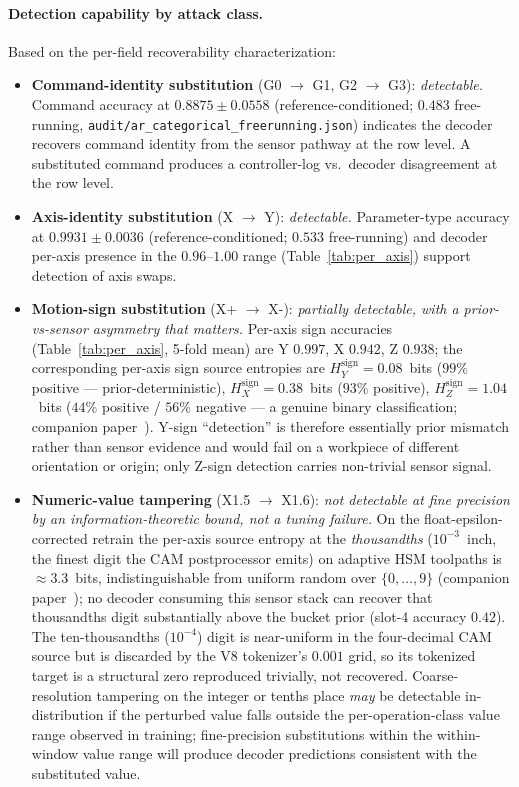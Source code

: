 \documentclass[11pt,a4paper]{article}
\begin{document}
\paragraph{Detection capability by attack class.} Based on the per-field recoverability characterization:
\begin{itemize}
\item \textbf{Command-identity substitution} (G0 $\to$ G1, G2 $\to$ G3): \emph{detectable.} Command accuracy at $0.8875 \pm 0.0558$ (reference-conditioned; $0.483$ free-running, \texttt{audit/ar\_categorical\_freerunning.json}) indicates the decoder recovers command identity from the sensor pathway at the row level. A substituted command produces a controller-log vs.\ decoder disagreement at the row level.
\item \textbf{Axis-identity substitution} (X $\to$ Y): \emph{detectable.} Parameter-type accuracy at $0.9931 \pm 0.0036$ (reference-conditioned; $0.533$ free-running) and decoder per-axis presence in the $0.96$--$1.00$ range (Table~\ref{tab:per_axis}) support detection of axis swaps.
\item \textbf{Motion-sign substitution} (X+ $\to$ X-): \emph{partially detectable, with a prior-vs-sensor asymmetry that matters.} Per-axis sign accuracies (Table~\ref{tab:per_axis}, 5-fold mean) are Y $0.997$, X $0.942$, Z $0.938$; the corresponding per-axis sign source entropies are $H_{Y}^{\text{sign}} = 0.08$~bits ($99\%$ positive --- prior-deterministic), $H_{X}^{\text{sign}} = 0.38$~bits ($93\%$ positive), $H_{Z}^{\text{sign}} = 1.04$~bits ($44\%$ positive / $56\%$ negative --- a genuine binary classification; companion paper~\cite{paperB_entropy}). Y-sign ``detection'' is therefore essentially prior mismatch rather than sensor evidence and would fail on a workpiece of different orientation or origin; only Z-sign detection carries non-trivial sensor signal.
\item \textbf{Numeric-value tampering} (X1.5 $\to$ X1.6): \emph{not detectable at fine precision by an information-theoretic bound, not a tuning failure.} On the float-epsilon-corrected retrain the per-axis source entropy at the \emph{thousandths} ($10^{-3}$~inch, the finest digit the CAM postprocessor emits) on adaptive HSM toolpaths is $\approx 3.3$~bits, indistinguishable from uniform random over $\{0,\ldots,9\}$ (companion paper~\cite{paperB_entropy}); no decoder consuming this sensor stack can recover that thousandths digit substantially above the bucket prior (slot-4 accuracy $0.42$). The ten-thousandths ($10^{-4}$) digit is near-uniform in the four-decimal CAM source but is discarded by the V8 tokenizer's $0.001$ grid, so its tokenized target is a structural zero reproduced trivially, not recovered. Coarse-resolution tampering on the integer or tenths place \emph{may} be detectable in-distribution if the perturbed value falls outside the per-operation-class value range observed in training; fine-precision substitutions within the within-window value range will produce decoder predictions consistent with the substituted value.

\end{itemize}
\end{document}
